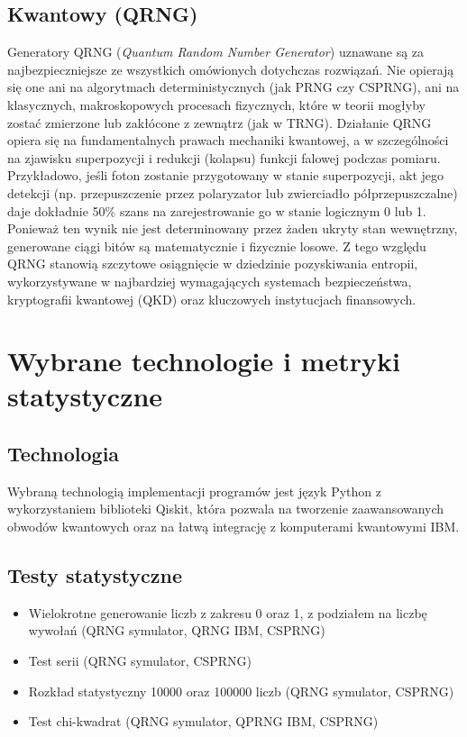 \documentclass{article}
\begin{document}
\subsection{Kwantowy (QRNG)}
Generatory QRNG (\textit{Quantum Random Number Generator}) uznawane są za najbezpieczniejsze ze wszystkich omówionych dotychczas rozwiązań. Nie opierają się one ani na algorytmach deterministycznych (jak PRNG czy CSPRNG), ani na klasycznych, makroskopowych procesach fizycznych, które w teorii mogłyby zostać zmierzone lub zakłócone z zewnątrz (jak w TRNG). Działanie QRNG opiera się na fundamentalnych prawach mechaniki kwantowej, a w szczególności na zjawisku superpozycji i redukcji (kolapsu) funkcji falowej podczas pomiaru. Przykładowo, jeśli foton zostanie przygotowany w stanie superpozycji, akt jego detekcji (np. przepuszczenie przez polaryzator lub zwierciadło półprzepuszczalne) daje dokładnie 50\% szans na zarejestrowanie go w stanie logicznym 0 lub 1. Ponieważ ten wynik nie jest determinowany przez żaden ukryty stan wewnętrzny, generowane ciągi bitów są matematycznie i fizycznie losowe. Z tego względu QRNG stanowią szczytowe osiągnięcie w dziedzinie pozyskiwania entropii, wykorzystywane w najbardziej wymagających systemach bezpieczeństwa, kryptografii kwantowej (QKD) oraz kluczowych instytucjach finansowych.
\section{Wybrane technologie i metryki statystyczne}
\subsection{Technologia}
Wybraną technologią implementacji programów jest język Python z wykorzystaniem biblioteki Qiskit, która pozwala na tworzenie zaawansowanych obwodów kwantowych oraz na łatwą integrację z komputerami kwantowymi IBM.
\subsection{Testy statystyczne}
\begin{itemize}
    \item Wielokrotne generowanie liczb z zakresu 0 oraz 1, z podziałem na liczbę wywołań (QRNG symulator, QRNG IBM, CSPRNG)
    \item Test serii (QRNG symulator, CSPRNG)
    \item Rozkład statystyczny 10000 oraz 100000 liczb (QRNG symulator, CSPRNG)
    \item Test chi-kwadrat (QRNG symulator, QPRNG IBM, CSPRNG)
\end{itemize}
\end{document}
